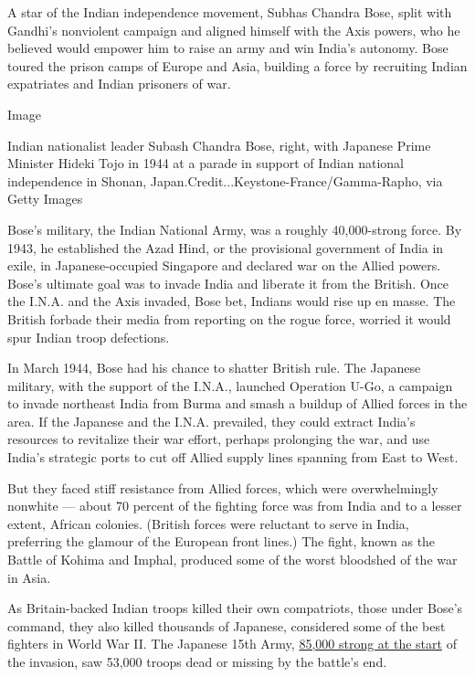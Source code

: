 A star of the Indian independence movement, Subhas Chandra Bose, split
with Gandhi's nonviolent campaign and aligned himself with the Axis
powers, who he believed would empower him to raise an army and win
India's autonomy. Bose toured the prison camps of Europe and Asia,
building a force by recruiting Indian expatriates and Indian prisoners
of war.

Image

Indian nationalist leader Subash Chandra Bose, right, with Japanese
Prime Minister Hideki Tojo in 1944 at a parade in support of Indian
national independence in Shonan,
Japan.Credit...Keystone-France/Gamma-Rapho, via Getty Images

Bose's military, the Indian National Army, was a roughly 40,000-strong
force. By 1943, he established the Azad Hind, or the provisional
government of India in exile, in Japanese-occupied Singapore and
declared war on the Allied powers. Bose's ultimate goal was to invade
India and liberate it from the British. Once the I.N.A. and the Axis
invaded, Bose bet, Indians would rise up en masse. The British forbade
their media from reporting on the rogue force, worried it would spur
Indian troop defections.

In March 1944, Bose had his chance to shatter British rule. The Japanese
military, with the support of the I.N.A., launched Operation U-Go, a
campaign to invade northeast India from Burma and smash a buildup of
Allied forces in the area. If the Japanese and the I.N.A. prevailed,
they could extract India's resources to revitalize their war effort,
perhaps prolonging the war, and use India's strategic ports to cut off
Allied supply lines spanning from East to West.

But they faced stiff resistance from Allied forces, which were
overwhelmingly nonwhite --- about 70 percent of the fighting force was
from India and to a lesser extent, African colonies. (British forces
were reluctant to serve in India, preferring the glamour of the European
front lines.) The fight, known as the Battle of Kohima and Imphal,
produced some of the worst bloodshed of the war in Asia.

As Britain-backed Indian troops killed their own compatriots, those
under Bose's command, they also killed thousands of Japanese, considered
some of the best fighters in World War II. The Japanese 15th Army,
\href{https://www.nytimes3xbfgragh.onion/2014/06/22/world/asia/a-largely-indian-victory-in-world-war-ii-mostly-forgotten-in-india.html}{85,000
strong at the start} of the invasion, saw 53,000 troops dead or missing
by the battle's end.

